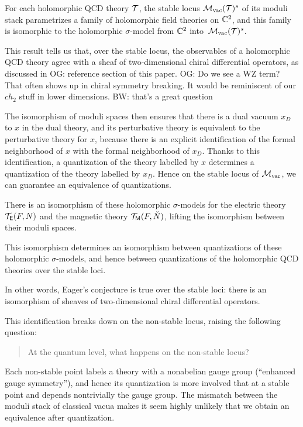 \documentclass[11pt]{amsart}
\def\brian#1{{\textcolor{blue!65!red}{BW: {#1}}}}
\def\owen#1{{\textcolor{violet!65!black}{OG: {#1}}}}
\begin{document}
\begin{prop}
For each holomorphic QCD theory $\mathcal T$, 
the stable locus $\mathcal M_{\rm vac}(\mathcal T)^s$ of its moduli stack parametrizes a family of holomorphic field theories on $\mathbb C^2$, 
and this family is isomorphic to the holomorphic $\sigma$-model from $\mathbb C^2$ into~$\mathcal M_{\rm vac}(\mathcal T)^s$.
\end{prop}

This result tells us that, over the stable locus, the observables of a holomorphic QCD theory agree with a sheaf of two-dimensional chiral differential operators, as discussed in \owen{reference section of this paper}.
\owen{Do we see a WZ term? That often shows up in chiral symmetry breaking. It would be reminiscent of our $ch_2$ stuff in lower dimensions.}
\brian{that's a great question}

The isomorphism of moduli spaces then ensures that there is a dual vacuum $x_D$ to $x$ in the dual theory, and its perturbative theory is equivalent to the perturbative theory for $x$,
because there is an explicit identification of the formal neighborhood of $x$ with the formal neighborhood of $x_D$. 
Thanks to this identification, a quantization of the theory labelled by $x$ determines a quantization of the theory labelled by $x_D$.
Hence on the stable locus of $\mathcal M_{\rm vac}$, we can guarantee an equivalence of quantizations.

\begin{prop}
There is an isomorphism of these holomorphic $\sigma$-models for the electric theory $\mathcal T_{\mathsf E}(F,N)$ and the magnetic theory $\mathcal T_{{\sf M}}(F,\check{N})$, lifting the isomorphism between their moduli spaces.

This isomorphism determines an isomorphism between quantizations of these holomorphic $\sigma$-models, and hence between quantizations of the holomorphic QCD theories over the stable loci.
\end{prop}

In other words, Eager's conjecture is true over the stable loci: there is an isomorphism of sheaves of two-dimensional chiral differential operators.

This identification breaks down on the non-stable locus, raising the following question:
\begin{quote}
At the quantum level, what happens on the non-stable locus? 
\end{quote}
Each non-stable point labels a theory with a nonabelian gauge group (``enhanced gauge symmetry''),
and hence its quantization is more involved that at a stable point and depends nontrivially the gauge group.
The mismatch between the moduli stack of classical vacua makes it seem highly unlikely that we obtain an equivalence after quantization.
\end{document}
